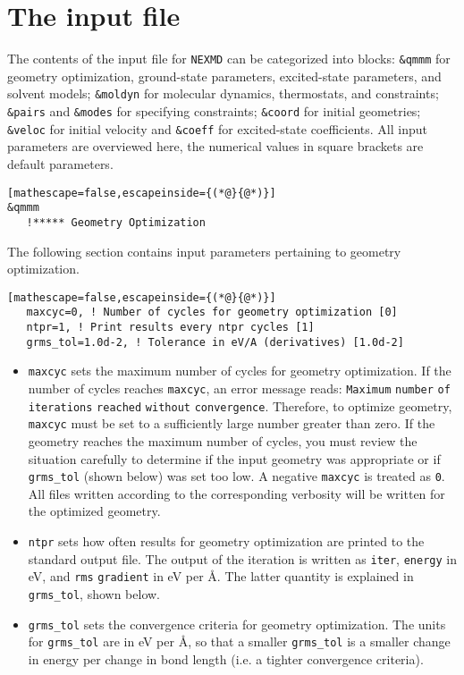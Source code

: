 \section{The input file}\label{Input_file}

The contents of the input file for \verb+NEXMD+ can be categorized into blocks: 
\verb+&qmmm+ for geometry optimization, ground-state parameters, excited-state parameters, and solvent models; \verb+&moldyn+ for molecular dynamics, thermostats, and constraints; \verb+&pairs+ and \verb+&modes+ for specifying constraints; \verb+&coord+ for initial geometries; \verb+&veloc+ for initial velocity and \verb+&coeff+ for excited-state coefficients.  All input parameters are overviewed here, the numerical values in square brackets are default parameters.
\vspace{0.5cm}

\begin{lstlisting}[mathescape=false,escapeinside={(*@}{@*)}]
&qmmm
   !***** Geometry Optimization
\end{lstlisting}
The following section contains input parameters pertaining to geometry optimization.
\begin{lstlisting}[mathescape=false,escapeinside={(*@}{@*)}]
   maxcyc=0, ! Number of cycles for geometry optimization [0]
   ntpr=1, ! Print results every ntpr cycles [1]
   grms_tol=1.0d-2, ! Tolerance in eV/A (derivatives) [1.0d-2]
\end{lstlisting}
\begin{itemize}
\item \verb+maxcyc+ sets the maximum number of cycles for geometry optimization.  If the number of cycles reaches \verb+maxcyc+, an error message reads: \verb+Maximum+ \verb+number+ \verb+of+ \verb+iterations+ \verb+reached+ \verb+without+ \verb+convergence+.  Therefore,  to optimize geometry, \verb+maxcyc+ must be set to a sufficiently large number greater than zero.  If the geometry reaches the maximum number of cycles, you must review the situation carefully to determine if the input geometry was appropriate or if \verb+grms_tol+ (shown below) was set too low.  A negative \verb+maxcyc+ is treated as \verb+0+. All files written according to the corresponding verbosity will be written for the optimized geometry.
\item \verb+ntpr+ sets how often results for geometry optimization are printed to the standard output file.  The output of the iteration is written as \verb+iter+, \verb+energy+ in eV, and \verb+rms+ \verb+gradient+ in eV per \AA.  The latter quantity is explained in \verb+grms_tol+, shown below.
\item \verb+grms_tol+ sets the convergence criteria for geometry optimization.  The units for \verb+grms_tol+ are in eV per \AA, so that a smaller \verb+grms_tol+ is a smaller change in energy per change in bond length (i.e. a tighter convergence criteria).
\end{itemize}


